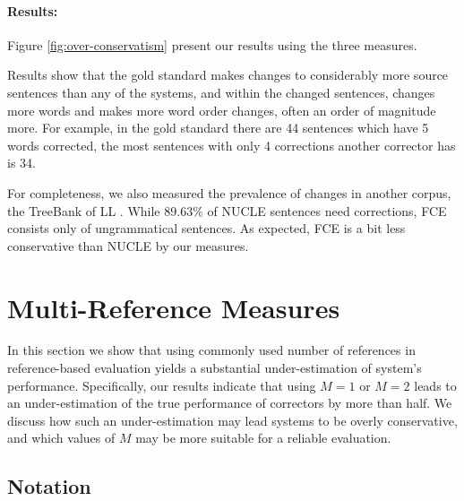 \documentclass[letter,11pt]{article}
\begin{document}
		\paragraph{Results:}
		Figure \ref{fig:over-conservatism} present our results using the three measures. %
		
		Results show that the gold standard makes changes to considerably more source sentences than any of the systems, and within the changed sentences, changes more words and makes more word order changes, often an order of magnitude more. For example, in the gold standard there are 44 sentences which have 5 words corrected, the most sentences with only 4 corrections another corrector has is 34.
		
		For completeness, we also measured the prevalence of changes in
		another corpus, the TreeBank of LL \cite[FCE]{yannakoudakis2011new}.
		While $89.63\%$ of NUCLE sentences need corrections, FCE consists only of ungrammatical sentences. As expected, FCE is a bit less conservative than NUCLE by our measures.
		
		
		\section{Multi-Reference Measures}\label{sec:increase-reference}
		
		In this section we show that using commonly used number of references in reference-based evaluation yields a substantial under-estimation of system's performance. Specifically, our results indicate that using $M=1$ or $M=2$ leads to an under-estimation of the true performance of correctors by more than half.
		We discuss how such an under-estimation may lead systems to be
		overly conservative, and which values of $M$ may be more suitable for
		a reliable evaluation.
		
		
		
		\subsection{Notation}
		
\end{document}
